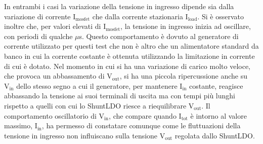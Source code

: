 In entrambi i casi la variazione della tensione in ingresso dipende sia dalla variazione di corrente $\mathrm{I_{mosfet}}$ che dalla corrente stazionaria $\mathrm{I_{load}}$. 
Si è osservato inoltre che, per valori elevati di $\mathrm{I_{mosfet}}$, la tensione in ingresso inizia ad oscillare, con periodi di qualche $\mu$s.
Questo comportamento è dovuto al generatore di corrente utilizzato per questi test che non \`e altro che un alimentatore standard da banco in cui la corrente costante è ottenuta utilizzando la limitazione in corrente di cui \`e dotato. Nel momento in cui si ha una variazione di carico molto veloce, che provoca un abbassamento di $\mathrm{V_{out}}$, si ha una piccola ripercussione anche su $\mathrm{V_{in}}$ dello stesso segno a cui il generatore, per mantenere $\mathrm{I_{in}}$ costante, reagisce abbassando la tensione ai suoi terminali di uscita ma con tempi più lunghi rispetto a quelli con cui lo ShuntLDO riesce a riequilibrare $\mathrm{V_{out}}$.
Il comportamento oscillatorio di $\mathrm{V_{in}}$, che compare quando $\mathrm{I_{tot}}$ è intorno al valore massimo, $\mathrm{I_{in}}$, ha permesso di constatare comunque come le fluttuazioni della tensione in ingresso non influiscano sulla tensione $\mathrm{V_{out}}$ regolata dallo ShuntLDO.

